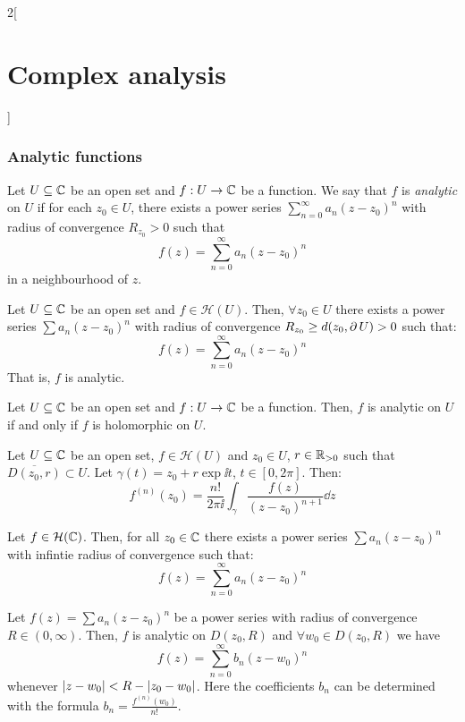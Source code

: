 \documentclass[../../../main_math.tex]{subfiles}
\begin{document}
\begin{multicols}{2}[\section{Complex analysis}]
  \subsubsection{Analytic functions}
  \begin{definition}
    Let $U\subseteq\mathbb{C}$ be an open set and $f:U\rightarrow \mathbb{C}$ be a function. We say that $f$ is \emph{analytic} on $U$ if for each $z_0\in U$, there exists a power series $\sum_{n=0}^\infty a_n{(z-z_0)}^n$ with radius of convergence $R_{z_0}>0$ such that $$f(z)=\sum_{n=0}^\infty a_n{(z-z_0)}^n$$ in a neighbourhood of $z$.
  \end{definition}
  \begin{theorem}
    Let $U\subseteq\mathbb{C}$ be an open set and $f\in\mathcal{H}(U)$. Then, $\forall z_0\in U$ there exists a power series $\sum a_n{(z-z_0)}^n$ with radius of convergence $R_{z_0}\geq d(z_0,\operatorname{\partial} U)>0$ such that: $$f(z)=\sum_{n=0}^\infty a_n{(z-z_0)}^n$$ That is, $f$ is analytic.
  \end{theorem}
  \begin{corollary}
    Let $U\subseteq\mathbb{C}$ be an open set and $f:U\rightarrow \mathbb{C}$ be a function. Then, $f$ is analytic on $U$ if and only if $f$ is holomorphic on $U$.
  \end{corollary}
  \begin{corollary}
    Let $U\subseteq\mathbb{C}$ be an open set, $f\in\mathcal{H}(U)$ and $z_0\in U$, $r\in\mathbb{R}_{>0}$ such that $\overline{D(z_0,r)}\subset U$. Let $\gamma(t)=z_0+r\exp{\ii t}$, $t\in[0,2\pi]$. Then:
    $$f^{(n)}(z_0)=\frac{n!}{2\pi\ii}\int_\gamma\frac{f(z)}{{(z-z_0)}^{n+1}}\dd{z}$$
  \end{corollary}
  \begin{corollary}
    Let $f\in\mathcal{H}(\mathbb{C})$. Then, for all $z_0\in\mathbb{C}$ there exists a power series $\sum a_n{(z-z_0)}^n$ with infintie radius of convergence such that: $$f(z)=\sum_{n=0}^\infty a_n{(z-z_0)}^n$$
  \end{corollary}
  \begin{corollary}
    Let $f(z)=\sum a_n{(z-z_0)}^n$ be a power series with radius of convergence $R\in(0,\infty)$. Then, $f$ is analytic on $D(z_0,R)$ and $\forall w_0\in D(z_0,R)$ we have $$f(z)=\sum_{n=0}^\infty b_n{(z-w_0)}^n$$ whenever $\abs{z-w_0}<R-|z_0-w_0|$. Here the coefficients $b_n$ can be determined with the formula $b_n=\frac{f^{(n)}(w_0)}{n!}$.
  \end{corollary}

\end{multicols}
\end{document}
